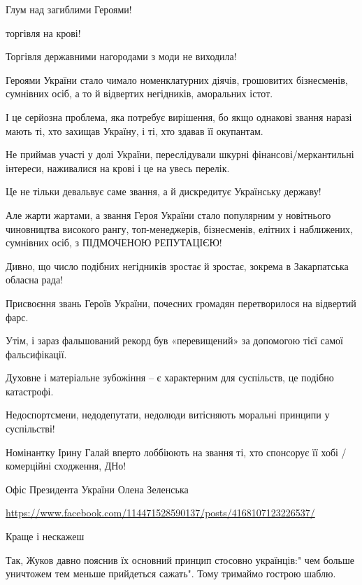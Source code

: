 \begin{itemize}
Глум над загиблими Героями!

торгівля на крові!

Торгівля державними нагородами з моди не виходила!

Героями України стало чимало номенклатурних діячів, грошовитих бізнесменів, сумнівних осіб, а то й відвертих негідників, аморальних істот.

І це серйозна проблема, яка потребує вирішення, бо якщо однакові звання наразі мають ті, хто захищав Україну, і ті, хто здавав її окупантам.

Не приймав участі у долі України, переслідували шкурні фінансові/меркантильні інтереси, наживалися на крові і це на увесь перелік.

Це не тільки девальвує саме звання, а й дискредитує Українську державу!

Але жарти жартами, а звання Героя України стало популярним у новітнього чиновництва високого рангу, топ-менеджерів, бізнесменів, елітних і наближених, сумнівних осіб, з ПІДМОЧЕНОЮ РЕПУТАЦІЄЮ!

Дивно, що число подібних негідників зростає й зростає, зокрема в Закарпатська обласна рада!

Присвоєння звань Героїв України, почесних громадян перетворилося на відвертий фарс.

Утім, і зараз фальшований рекорд був «перевищений» за допомогою тієї самої фальсифікації.

Духовне і
матеріальне зубожіння – є характерним для суспільств, це подібно катастрофі.

Недоспортсмени, недодепутати, недолюди витісняють моральні принципи у суспільстві!

Номінантку Ірину Галай вперто лоббіюють на звання ті, хто спонсорує її хобі /комерційні сходження, ДНо!

Офіс Президента України
Олена Зеленська

\url{https://www.facebook.com/114471528590137/posts/4168107123226537/}

 
Краще і нескажеш

 

Так, Жуков давно пояснив їх основний принцип стосовно українців:" чем больше
уничтожем тем меньше прийдеться сажать". Тому тримаймо гострою шаблю.
\end{itemize}


